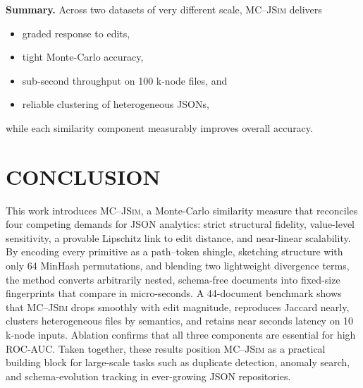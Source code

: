 \documentclass[sigconf]{acmart}
\begin{document}
\bigskip
\noindent\textbf{Summary.}
Across two datasets of very different scale, \textsc{MC--JSim} delivers

\begin{itemize}
\item graded response to edits,
\item tight Monte-Carlo accuracy,
\item sub-second throughput on 100 k-node files, and
\item reliable clustering of heterogeneous JSONs,
\end{itemize}

while each similarity component measurably improves overall accuracy.

\section{CONCLUSION}
This work introduces \textsc{MC--JSim}, a Monte-Carlo similarity measure that reconciles four competing demands for JSON analytics: strict structural fidelity, value-level sensitivity, a provable Lipschitz link to edit distance, and near-linear scalability. By encoding every primitive as a path–token shingle, sketching structure with only 64 MinHash permutations, and blending two lightweight divergence terms, the method converts arbitrarily nested, schema-free documents into fixed-size fingerprints that compare in micro-seconds. A 44-document benchmark shows that \textsc{MC--JSim} drops smoothly with edit magnitude, reproduces Jaccard nearly, clusters heterogeneous files by semantics, and retains near seconds latency on 10 k-node inputs. Ablation confirms that all three components are essential for high ROC-AUC. Taken together, these results position \textsc{MC--JSim} as a practical building block for large-scale tasks such as duplicate detection, anomaly search, and schema-evolution tracking in ever-growing JSON repositories.

\nocite{*}


\end{document}
